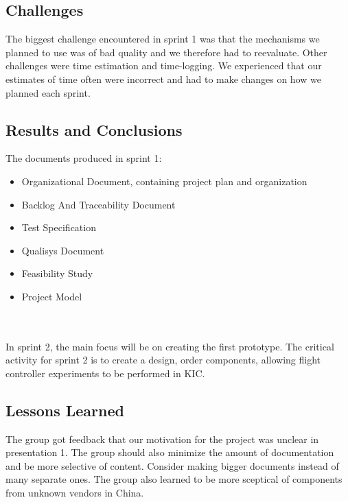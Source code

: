 \subsection{Challenges}


The biggest challenge encountered in sprint 1 was that the mechanisms we planned to use was of bad quality and we therefore had to reevaluate. Other challenges were time estimation and time-logging. We experienced that our estimates of time often were incorrect and had to make changes on how we planned each sprint.

\subsection{Results and Conclusions}

The documents produced in sprint 1:
\begin{itemize}
    \item Organizational Document, containing project
 plan and organization
    \item Backlog And Traceability Document
    \item Test Specification
    \item Qualisys Document
    \item Feasibility Study
    \item Project Model
\end{itemize}
\\\\
In sprint 2, the main focus will be on creating the first prototype. The critical activity for sprint 2 is to create a design, order
components, allowing flight controller experiments to be performed
in KIC.

\subsection{Lessons Learned}

The group got feedback that our motivation for the project was unclear in presentation 1. The group should also minimize the amount of documentation and be more selective of content. Consider making bigger documents instead of many separate ones.
The group also learned to be more sceptical of components from unknown vendors in China.


